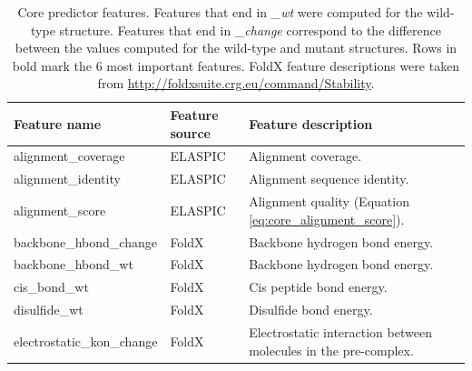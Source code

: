 \clearpage

\begin{table}[tb]
	\centering
	\caption[Features selected for the core predictor.]{
		Core predictor features.
		Features that end in \textit{\_wt} were computed for the wild-type structure.
		Features that end in \textit{\_change} correspond to the difference between the values computed for the wild-type and mutant structures.
		Rows in bold mark the 6 most important features.
		FoldX feature descriptions were taken from \url{http://foldxsuite.crg.eu/command/Stability}.
	}
	\label{tab:core_features}
	\begin{tabular}{ l | l | p{7cm} }
		\toprule
		Feature name                              & Feature source   & Feature description                                                                                                   \\
		\midrule
		alignment\_coverage                       & ELASPIC          & Alignment coverage.                                                                                                   \\
		alignment\_identity                       & ELASPIC          & Alignment sequence identity.                                                                                          \\
		alignment\_score                          & ELASPIC          & Alignment quality (Equation \ref{eq:core_alignment_score}).                                                           \\
		backbone\_hbond\_change                   & FoldX            & Backbone hydrogen bond energy.                                                                                        \\
		backbone\_hbond\_wt                       & FoldX            & Backbone hydrogen bond energy.                                                                                        \\
		cis\_bond\_wt                             & FoldX            & Cis peptide bond energy.                                                                                              \\
		disulfide\_wt                             & FoldX            & Disulfide bond energy.                                                                                                \\
		electrostatic\_kon\_change                & FoldX            & Electrostatic interaction between molecules in the pre-complex.                                                       \\

\end{tabular}
\end{table}
